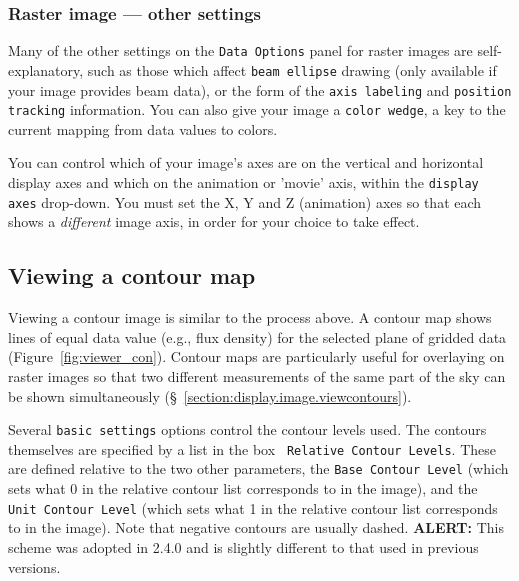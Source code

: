 \subsubsection{Raster image --- other settings}
\label{section:display.image.raster.adjust.other}

Many of the other settings on the {\tt Data Options} panel for raster images
are self-explanatory, such as those which affect {\tt beam ellipse} drawing
(only available if your image provides beam data), or the form of the
{\tt axis labeling} and {\tt position tracking} information.  You can also
give your image a {\tt color wedge}, a key to the current mapping from data
values to colors.

You can control which of your image's axes are on the vertical and horizontal
display axes and which on the animation or 'movie' axis, within the
{\tt display axes} drop-down.  You must set the X, Y and Z (animation) axes
so that each shows a {\it different} image axis, in order for your choice
to take effect.

\subsection{Viewing a contour map}
\label{section:display.image.contour}

Viewing a contour image is similar to the process above. A contour map
shows lines of equal data value (e.g., flux density) for the
selected plane of gridded data (Figure~\ref{fig:viewer_con}).
Contour maps are particularly useful for overlaying on raster images so
that two different measurements of the same part of the sky can be shown
simultaneously (\S~\ref{section:display.image.viewcontours}).

Several {\tt basic settings} options control the contour levels used.
The contours themselves are specified by a list in the box {\tt
  Relative Contour Levels}.  These are defined relative to the two
other parameters, the {\tt Base Contour Level} (which sets what 0 in the
relative contour list corresponds to in the image), and the {\tt
  Unit Contour Level} (which sets what 1 in the relative contour list
corresponds to in the image).  Note that negative contours are usually
dashed. 
 {\bf ALERT:} This scheme was
adopted in 2.4.0 and is slightly different to that used in previous
versions.

